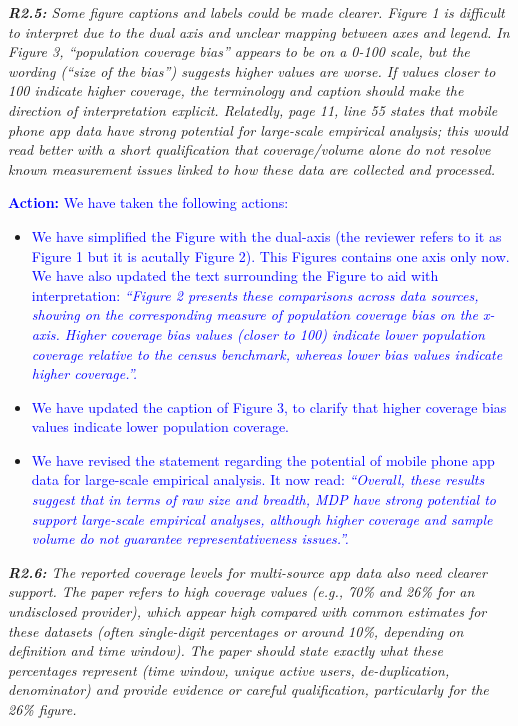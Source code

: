 \documentclass[
  letterpaper,
  DIV=11,
  numbers=noendperiod]{scrartcl}
\begin{document}
\setlength{\leftskip}{0cm}\textit{\textbf{R2.5:} Some figure captions and labels could be made clearer. Figure 1 is difficult to interpret due to the dual axis and unclear mapping between axes and legend. In Figure 3, ``population coverage bias'' appears to be on a 0-100 scale, but the wording (``size of the bias'') suggests higher values are worse. If values closer to 100 indicate higher coverage, the terminology and caption should make the direction of interpretation explicit. Relatedly, page 11, line 55 states that mobile phone app data have strong potential for large-scale empirical analysis; this would read better with a short qualification that coverage/volume alone do not resolve known measurement issues linked to how these data are collected and processed.}

\setlength{\leftskip}{0.5cm}\textcolor{blue}{\textbf{Action:} We have taken the following actions:}

\vspace{-3mm} \begin{itemize}[noitemsep, topsep=0pt]
\item \textcolor{blue}{ We have simplified the Figure with the dual-axis (the reviewer refers to it as Figure 1 but it is acutally Figure 2). This Figures contains one axis only now. We have also updated the text surrounding the Figure to aid with interpretation: \textit{``Figure 2 presents these comparisons across data sources, showing on the corresponding measure of population coverage bias on the x-axis. Higher coverage bias values (closer to 100) indicate lower population coverage relative to the census benchmark, whereas lower bias values indicate higher coverage.''.}}
\item \textcolor{blue}{We have updated the caption of Figure 3, to clarify that higher coverage bias values indicate lower population coverage.}
\item \textcolor{blue}{We have revised the statement regarding the potential of mobile phone app data for large-scale empirical analysis. It now read: \textit{``Overall, these results suggest that in terms of raw size and breadth, MDP have strong potential to support large-scale empirical analyses, although higher coverage and sample volume do not guarantee representativeness issues.''.}}
\end{itemize}

\setlength{\leftskip}{0cm}\textit{\textbf{R2.6:}  The reported coverage levels for multi-source app data also need clearer support. The paper refers to high coverage values (e.g., 70\% and 26\% for an undisclosed provider), which appear high compared with common estimates for these datasets (often single-digit percentages or around 10\%, depending on definition and time window). The paper should state exactly what these percentages represent (time window, unique active users, de-duplication, denominator) and provide evidence or careful qualification, particularly for the 26\% figure.}
\end{document}
